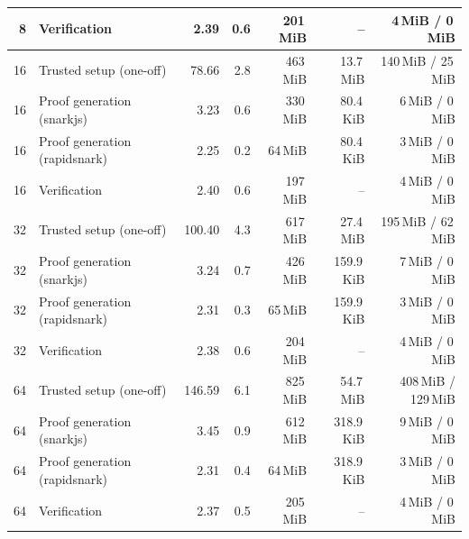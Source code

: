 \begin{table}[t]
{\begin{tabular}{|r|l|r|r|r|r|r|}
8 & Verification & 2.39 & 0.6 & 201\,MiB & -- & 4\,MiB / 0\,MiB \\
\hline
16 & Trusted setup (one-off) & 78.66 & 2.8 & 463\,MiB & 13.7\,MiB & 140\,MiB / 25\,MiB \\
16 & Proof generation (snarkjs) & 3.23 & 0.6 & 330\,MiB & 80.4\,KiB & 6\,MiB / 0\,MiB \\
16 & Proof generation (rapidsnark) & 2.25 & 0.2 & 64\,MiB & 80.4\,KiB & 3\,MiB / 0\,MiB \\
16 & Verification & 2.40 & 0.6 & 197\,MiB & -- & 4\,MiB / 0\,MiB \\
\hline
32 & Trusted setup (one-off) & 100.40 & 4.3 & 617\,MiB & 27.4\,MiB & 195\,MiB / 62\,MiB \\
32 & Proof generation (snarkjs) & 3.24 & 0.7 & 426\,MiB & 159.9\,KiB & 7\,MiB / 0\,MiB \\
32 & Proof generation (rapidsnark) & 2.31 & 0.3 & 65\,MiB & 159.9\,KiB & 3\,MiB / 0\,MiB \\
32 & Verification & 2.38 & 0.6 & 204\,MiB & -- & 4\,MiB / 0\,MiB \\
\hline
64 & Trusted setup (one-off) & 146.59 & 6.1 & 825\,MiB & 54.7\,MiB & 408\,MiB / 129\,MiB \\
64 & Proof generation (snarkjs) & 3.45 & 0.9 & 612\,MiB & 318.9\,KiB & 9\,MiB / 0\,MiB \\
64 & Proof generation (rapidsnark) & 2.31 & 0.4 & 64\,MiB & 318.9\,KiB & 3\,MiB / 0\,MiB \\
64 & Verification & 2.37 & 0.5 & 205\,MiB & -- & 4\,MiB / 0\,MiB \\
\hline
\end{tabular}}
\end{table}
